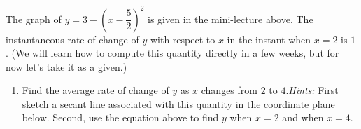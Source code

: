 \documentclass[10pt]{article}
\begin{document}
 The graph of $y=3-\left(x-\dfrac52\right)^2$ is given in the mini-lecture above. The instantaneous rate of change of $y$ with respect to $x$ in the instant when $x=2$ is $1$. (We will learn how to compute this quantity directly in a few weeks, but for now let's take it as a given.)

\begin{enumerate}

\item[(a)] Find the average rate of change of $y$ as $x$ changes from $2$ to $4$.{\em Hints:} First sketch  a secant line associated with this quantity  in the coordinate plane below. Second, use the equation above to find $y$ when $x=2$ and  when $x=4$.\\
%


\end{enumerate}
\end{document}
